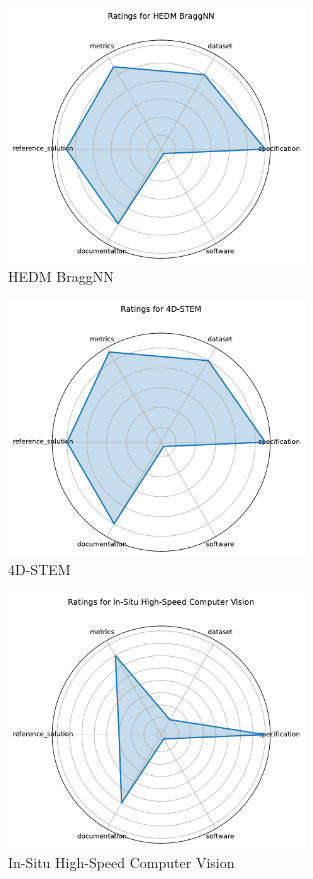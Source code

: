 \documentclass{article}
\begin{document}
\begin{figure}[h!]
  \centering
  \includegraphics[width=0.7\textwidth]{HEDM BraggNN_radar.pdf}
  \caption{HEDM BraggNN}
\end{figure}

\begin{figure}[h!]
  \centering
  \includegraphics[width=0.7\textwidth]{4D-STEM_radar.pdf}
  \caption{4D-STEM}
\end{figure}

\begin{figure}[h!]
  \centering
  \includegraphics[width=0.7\textwidth]{In-Situ High-Speed Computer Vision_radar.pdf}
  \caption{In-Situ High-Speed Computer Vision}
\end{figure}
\end{document}
